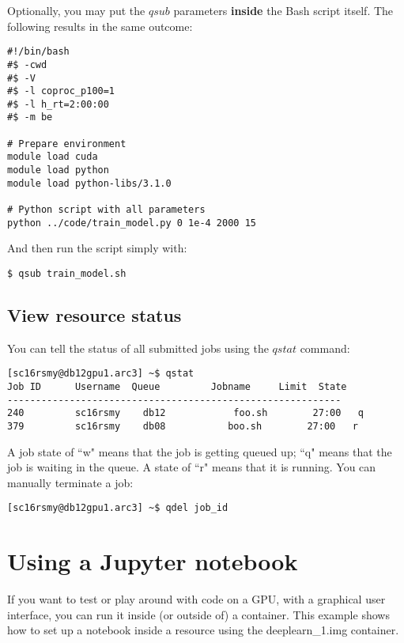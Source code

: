 \documentclass[]{article}
\begin{document}
Optionally, you may put the \(qsub\) parameters \textbf{inside} the Bash script itself. The following results in the same outcome:

\begin{lstlisting}
#!/bin/bash
#$ -cwd
#$ -V
#$ -l coproc_p100=1
#$ -l h_rt=2:00:00
#$ -m be

# Prepare environment
module load cuda
module load python
module load python-libs/3.1.0

# Python script with all parameters
python ../code/train_model.py 0 1e-4 2000 15         
\end{lstlisting}

And then run the script simply with:

\begin{lstlisting}
$ qsub train_model.sh             
\end{lstlisting}

\subsection{View resource status}

You can tell the status of all submitted jobs using the \(qstat\) command:

\begin{lstlisting}
[sc16rsmy@db12gpu1.arc3] ~$ qstat
Job ID      Username  Queue         Jobname     Limit  State 
-----------------------------------------------------------
240         sc16rsmy    db12            foo.sh        27:00   q     
379         sc16rsmy    db08           boo.sh        27:00   r   
\end{lstlisting}

A job state of ``w" means that the job is getting queued up; ``q" means that the job is waiting in the queue. A state of ``r" means that it is running. You can manually terminate a job:

\begin{lstlisting}
[sc16rsmy@db12gpu1.arc3] ~$ qdel job_id
\end{lstlisting}

\section{Using a Jupyter notebook}
\label{jupyter}

If you want to test or play around with code on a GPU, with a graphical user interface, you can run it inside (or outside of) a container. This example shows how to set up a notebook inside a resource using the deeplearn\_1.img container.
\end{document}
